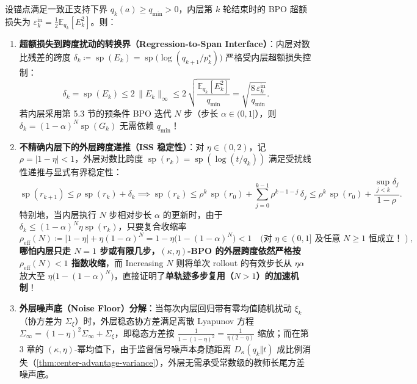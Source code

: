 \documentclass[lang=cn,scheme=chinese,openany]{../book/elegantbook}
\newcommand{\E}{\mathbb E}
\begin{document}
\begin{theorem}
\label{dyn:regression-gap}
\label{dyn:thm:hs-input-state}
\label{dyn:thm:hs-covariance}
\label{dyn:soft-local}
设锚点满足一致正支持下界 $q_k(a)\ge q_{\min}>0$，内层第 $k$ 轮结束时的 BPO 超额损失为 $\varepsilon_k^{\mathrm{in}}=\frac12\E_{q_k}[E_k^2]$。则：
\begin{enumerate}
 \item \textbf{超额损失到跨度扰动的转换界（Regression-to-Span Interface）}：内层对数比残差的跨度 $\delta_k\coloneqq \operatorname{sp}(E_k)=\operatorname{sp}\bigl(\log(q_{k+1}/p^\star_k)\bigr)$ 严格受内层超额损失控制：
 \begin{equation}
  \delta_k = \operatorname{sp}(E_k) \le 2\,\|E_k\|_\infty \le 2\,\sqrt{\frac{\E_{q_k}[E_k^2]}{q_{\min}}} = \sqrt{\frac{8\,\varepsilon_k^{\mathrm{in}}}{q_{\min}}}.
  \label{eq:regression-to-span}
 \end{equation}
 若内层采用第 5.3 节的预条件 BPO 迭代 $N$ 步（步长 $\alpha\in(0,1]$），则 $\delta_k=(1-\alpha)^N\operatorname{sp}(G_k)$ 无需依赖 $q_{\min}$！
 \item \textbf{不精确内层下的外层跨度递推（ISS 稳定性）}：对 $\eta\in(0,2)$，记 $\rho=|1-\eta|<1$，外层对数比跨度 $\operatorname{sp}(r_k)=\operatorname{sp}(\log(t/q_k))$ 满足受扰线性递推与显式有界稳定性：
 \begin{equation}
  \operatorname{sp}(r_{k+1}) \le \rho\,\operatorname{sp}(r_k) + \delta_k
  \implies
  \operatorname{sp}(r_k) \le \rho^k\,\operatorname{sp}(r_0) + \sum_{j=0}^{k-1}\rho^{k-1-j}\,\delta_j
  \le \rho^k\,\operatorname{sp}(r_0) + \frac{\sup_{j<k}\delta_j}{1-\rho}.
  \label{eq:outer-iss-bound}
 \end{equation}
 特别地，当内层执行 $N$ 步相对步长 $\alpha$ 的更新时，由于 $\delta_k\le (1-\alpha)^N\eta\operatorname{sp}(r_k)$，只要复合收缩率
 \begin{equation}
  \rho_{\mathrm{eff}}(N) \coloneqq |1-\eta| + \eta(1-\alpha)^N = 1 - \eta\bigl(1-(1-\alpha)^N\bigr) < 1\quad(\text{对 }\eta\in(0,1]\text{ 及任意 }N\ge 1\text{ 恒成立！}),
 \end{equation}
 \textbf{哪怕内层只走 $N=1$ 步或有限几步，$(\kappa,\eta)$-BPO 的外层跨度依然严格按 $\rho_{\mathrm{eff}}(N)<1$ 指数收缩}，而 Increasing $N$ 则将单次 rollout 的有效步长从 $\eta\alpha$ 放大至 $\eta\bigl(1-(1-\alpha)^N\bigr)$，直接证明了\textbf{单轨迹多步复用（$N>1$）的加速机制}！
 \item \textbf{外层噪声底（Noise Floor）分解}：当每次内层回归带有零均值随机扰动 $\xi_k$（协方差为 $\Sigma_\xi$）时，外层稳态协方差满足离散 Lyapunov 方程 $\Sigma_\infty=(1-\eta)^2\Sigma_\infty+\Sigma_\xi$，即稳态方差按 $\frac{1}{1-(1-\eta)^2}=\frac{1}{\eta(2-\eta)}$ 缩放；而在第 3 章的 $(\kappa,\eta)$-幂均值下，由于监督信号噪声本身随距离 $D_\kappa(q_k\Vert t)$ 成比例消失（\cref{thm:center-advantage-variance}），外层无需承受常数级的教师长尾方差噪声底。

\end{enumerate}
\end{theorem}
\end{document}
